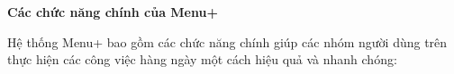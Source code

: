 
\textbf{Các chức năng chính của Menu+}

Hệ thống Menu+ bao gồm các chức năng chính giúp các nhóm người dùng trên thực hiện các công việc hàng ngày một cách hiệu quả và nhanh chóng:

